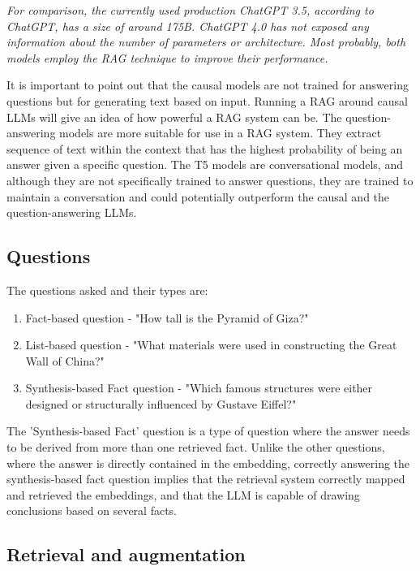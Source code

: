 \documentclass{wseas}
\begin{document}
\emph{For comparison, the currently used production ChatGPT 3.5,
according to ChatGPT, has a size of around 175B. ChatGPT 4.0 has not
exposed any information about the number of parameters or architecture.
Most probably, both models employ the RAG technique to improve their
performance.}

It is important to point out that the causal models are not trained for
answering questions but for generating text based on input. Running a
RAG around causal LLMs will give an idea of how powerful a RAG system
can be. The question-answering models are more suitable for use in a
RAG system. They extract sequence of text within the context
that has the highest probability of being an answer given a specific
question. The T5 models are conversational models, and although they are
not specifically trained to answer questions, they are trained to
maintain a conversation and could potentially outperform the causal and the
question-answering LLMs.

\subsection{Questions}

The questions asked and their types are:

\begin{enumerate}
\def\labelenumi{\arabic{enumi}.}
\item
  Fact-based question - "How tall is the Pyramid of Giza?"
\item
  List-based question - "What materials were used in constructing the
  Great Wall of China?"
\item
  Synthesis-based Fact question - "Which famous structures were either
  designed or structurally influenced by Gustave Eiffel?"
\end{enumerate}

The 'Synthesis-based Fact' question is a type of question where the
answer needs to be derived from more than one retrieved fact. Unlike the
other questions, where the answer is directly contained in the
embedding, correctly answering the synthesis-based fact question implies
that the retrieval system correctly mapped and retrieved the embeddings,
and that the LLM is capable of drawing conclusions based on several
facts.


\subsection{Retrieval and augmentation}
\end{document}
